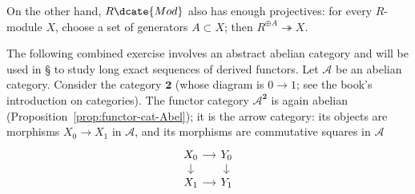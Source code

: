 On the other hand, $R\dcate{Mod}$ also has enough projectives: for every
$R$-module $X$, choose a set of generators $A\subset X$; then
$R^{\oplus A}\twoheadrightarrow X$.

\begin{example}\label{eg:A2-injective-projective}
The following combined exercise involves an abstract abelian category and will
be used in \S{} to study long exact
sequences of derived functors. Let $\mathcal{A}$ be an abelian category.
Consider the category $\mathbf{2}$ (whose diagram is $0\to1$; see the book's
introduction on categories). The functor category
$\mathcal{A}^{\mathbf{2}}$ is again abelian
(Proposition~\ref{prop:functor-cat-Abel}); it is the arrow category: its
objects are morphisms $X_0\to X_1$ in $\mathcal{A}$, and its morphisms are
commutative squares in $\mathcal{A}$
\[\begin{tikzcd}[row sep=small, column sep=small]
	X_0 \arrow[r] \arrow[d] & Y_0 \arrow[d] \\
	X_1 \arrow[r] & Y_1
\end{tikzcd}\]


\end{example}
